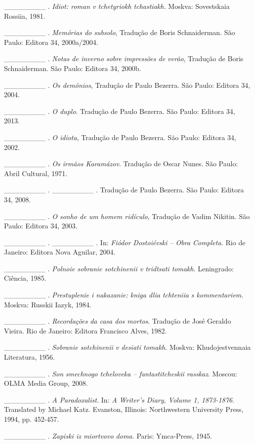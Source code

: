 \_\_\_\_\_\_\_\_ . \emph{Idiot: roman v tchetyriokh tchastiakh.} Moskva:
Sovestskaia Rossiia, 1981.

\_\_\_\_\_\_\_\_ . \emph{Memórias do subsolo}, Tradução de Boris
Schnaiderman. São Paulo: Editora 34, 2000a/2004.

\_\_\_\_\_\_\_\_ . \emph{Notas de inverno sobre impressões de verão},
Tradução de Boris Schnaiderman. São Paulo: Editora 34, 2000b.

\_\_\_\_\_\_\_\_ . \emph{Os demônios}, Tradução de Paulo Bezerra. São
Paulo: Editora 34, 2004.

\_\_\_\_\_\_\_\_ . \emph{O duplo}. Tradução de Paulo Bezerra. São Paulo:
Editora 34, 2013.

\_\_\_\_\_\_\_\_ . \emph{O idiota}, Tradução de Paulo Bezerra. São
Paulo: Editora 34, 2002.

\_\_\_\_\_\_\_\_ . \emph{Os irmãos Karamázov}. Tradução de Oscar Nunes.
São Paulo: Abril Cultural, 1971.

\_\_\_\_\_\_\_\_ . \_\_\_\_\_\_\_\_ . Tradução de Paulo Bezerra. São
Paulo: Editora 34, 2008.

\_\_\_\_\_\_\_\_ . \emph{O sonho de um homem ridículo}, Tradução de
Vadim Nikitin. São Paulo: Editora 34, 2003.

\_\_\_\_\_\_\_\_ . \_\_\_\_\_\_\_\_ \emph{.} In: \emph{Fiódor
Dostoiévski -- Obra Completa.} Rio de Janeiro: Editora Nova Aguilar,
2004.

\_\_\_\_\_\_\_\_ . \emph{Polnoie sobranie sotchinenii v tridtsati
tomakh}. Leningrado: Ciência, 1985.

\_\_\_\_\_\_\_\_ . \emph{Prestuplenie i nakazanie: kniga dlia tchteniia
s kommentariem.} Moskva: Russkii Iazyk, 1984.

\_\_\_\_\_\_\_\_ . \emph{Recordações da casa dos mortos}. Tradução de
José Geraldo Vieira. Rio de Janeiro: Editora Francisco Alves, 1982.

\_\_\_\_\_\_\_\_ . \emph{Sobranie sotchinenii v desiati tomakh.} Moskva:
Khudojestvennaia Literatura, 1956.

\_\_\_\_\_\_\_\_ . \emph{Son smechnogo tcheloveka -- fantastitcheskii
rasskaz}. Moscou: OLMA Media Group, 2008.

\_\_\_\_\_\_\_\_ . \emph{A Paradoxalist.} In: \emph{A Writer's Diary,
Volume 1, 1873-1876}. Translated by Michael Katz. Evanston, Illinois:
Northwestern University Press, 1994, pp. 452-457.

\_\_\_\_\_\_\_\_ . \emph{Zapiski iz miortvovo doma.} Paris: Ymca-Press,
1945.

